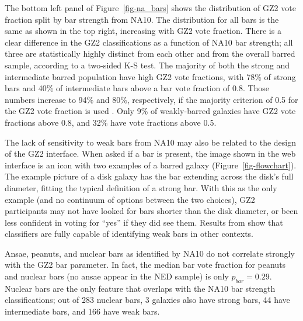 \documentclass[useAMS,usenatbib]{mn2e}
\begin{document}

The bottom left panel of Figure~\ref{fig-na_bars} shows the distribution of GZ2 vote fraction split by bar strength from NA10. The distribution for all bars is the same as shown in the top right, increasing with GZ2 vote fraction. There is a clear difference in the GZ2 classifications as a function of NA10 bar strength; all three are statistically highly distinct from each other and from the overall barred sample, according to a two-sided K-S test. The majority of both the strong and intermediate barred population have high GZ2 vote fractions, with 78\% of strong bars and 40\% of intermediate bars above a bar vote fraction of 0.8. Those numbers increase to 94\% and 80\%, respectively, if the majority criterion of 0.5 for the GZ2 vote fraction is used \citep{mas11c}. Only 9\% of weakly-barred galaxies have GZ2 vote fractions above 0.8, and 32\% have vote fractions above 0.5. 

The lack of sensitivity to weak bars from NA10 may also be related to the design of the GZ2 interface. When asked if a bar is present, the image shown in the web interface is an icon with two examples of a barred galaxy (Figure~\ref{fig-flowchart}). The example picture of a disk galaxy has the bar extending across the disk's full diameter, fitting the typical definition of a strong bar. With this as the only example (and no continuum of options between the two choices), GZ2 participants may not have looked for bars shorter than the disk diameter, or been less confident in voting for ``yes'' if they did see them. Results from \citet{hoy11} show that classifiers are fully capable of identifying weak bars in other contexts.

Ansae, peanuts, and nuclear bars as identified by NA10 do not correlate strongly with the GZ2 bar parameter. In fact, the median bar vote fraction for peanuts and nuclear bars (no ansae appear in the NED sample) is only $p_{bar}=0.29$. Nuclear bars are the only feature that overlaps with the NA10 bar strength classifications; out of 283 nuclear bars, 3 galaxies also have strong bars, 44 have intermediate bars, and 166 have weak bars.
\end{document}
